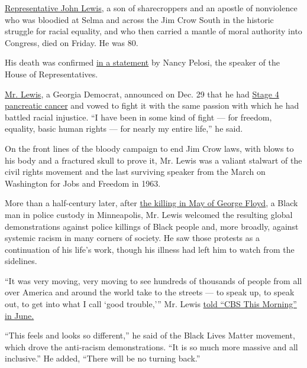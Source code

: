 \href{https://www.nytimes.com/2020/07/30/us/john-lewis-live-funeral.html}{Representative
John Lewis}, a son of sharecroppers and an apostle of nonviolence who
was bloodied at Selma and across the Jim Crow South in the historic
struggle for racial equality, and who then carried a mantle of moral
authority into Congress, died on Friday. He was 80.

His death was confirmed
\href{https://www.speaker.gov/newsroom/71720-}{in a statement} by Nancy
Pelosi, the speaker of the House of Representatives.

\href{https://www.nytimes.com/2020/08/04/us/politics/trump-john-lewis-axios.html}{Mr.
Lewis}, a Georgia Democrat, announced on Dec. 29 that he had
\href{https://www.nytimes.com/2019/12/29/us/politics/rep-john-lewis-pancreatic-cancer.html}{Stage
4 pancreatic cancer} and vowed to fight it with the same passion with
which he had battled racial injustice. ``I have been in some kind of
fight --- for freedom, equality, basic human rights --- for nearly my
entire life,'' he said.

On the front lines of the bloody campaign to end Jim Crow laws, with
blows to his body and a fractured skull to prove it, Mr. Lewis was a
valiant stalwart of the civil rights movement and the last surviving
speaker from the March on Washington for Jobs and Freedom in 1963.

More than a half-century later, after
\href{https://www.nytimes.com/2020/07/08/us/george-floyd-body-camera-transcripts.html}{the
killing in May of George Floyd}, a Black man in police custody in
Minneapolis, Mr. Lewis welcomed the resulting global demonstrations
against police killings of Black people and, more broadly, against
systemic racism in many corners of society. He saw those protests as a
continuation of his life's work, though his illness had left him to
watch from the sidelines.

``It was very moving, very moving to see hundreds of thousands of people
from all over America and around the world take to the streets --- to
speak up, to speak out, to get into what I call `good trouble,''' Mr.
Lewis
\href{https://www.cbs.com/shows/cbs_this_morning/video/XpTqoXY0ErhQ0nqUvSJoL5n9sbgrvXLT/rep-john-lewis-message-to-protesters-fighting-for-racial-equality/}{told
``CBS This Morning'' in June.}

``This feels and looks so different,'' he said of the Black Lives Matter
movement, which drove the anti-racism demonstrations. ``It is so much
more massive and all inclusive.'' He added, ``There will be no turning
back.''

